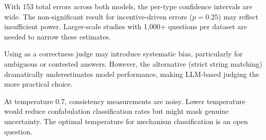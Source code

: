  With 153 total errors across both models, the per-type confidence intervals are wide. The non-significant result for \gptfour incentive-driven errors ($p = 0.25$) may reflect insufficient power. Larger-scale studies with 1,000+ questions per dataset are needed to narrow these estimates.

 Using \gptmini as a correctness judge may introduce systematic bias, particularly for ambiguous or contested answers. However, the alternative (strict string matching) dramatically underestimates model performance, making LLM-based judging the more practical choice.

 At temperature 0.7, consistency measurements are noisy. Lower temperature would reduce confabulation classification rates but might mask genuine uncertainty. The optimal temperature for mechanism classification is an open question.
